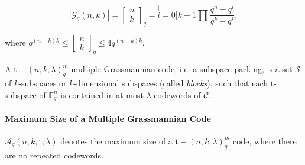 \[
\left|\mathcal{G}_{q}\left(n,k\right)\right|=\left[\begin{array}{c}
n\\
k
\end{array}\right]_{q}=\stackrel[i=0]{k-1}{\prod}\frac{q^{n}-q^{i}}{q^{k}-q^{i}},
\]

where $q^{\left(n-k\right)k}\leq\left[\begin{array}{c}
n\\
k
\end{array}\right]_{q}\leq4q^{\left(n-k\right)k}$.

\begin{defn}
 A $\mathrm{t}-\left(n,k,\lambda\right)_{q}^{m}$ multiple Grassmannian
code, i.e. a subspace packing, is a set $\mathcal{S}$ of $k$-subspaces
or $k$-dimensional subspaces (called \textit{blocks}), such that
each $\mathrm{t}$-subspace of $\ensuremath{\mathbb{F}}_{q}^{n}$
is contained in at most $\lambda$ codewords of $\mathcal{C}$. 
\end{defn}

\paragraph*{Maximum Size of a Multiple Grassmannian Code}

$\mathcal{A}_{q}\left(n,k,\mathrm{t};\lambda\right)$ denotes the
maximum size of a $\mathrm{t}-\left(n,k,\lambda\right)_{q}^{m}$ code,
where there are no repeated codewords. \cite{Etzion:2018}

\clearpage
